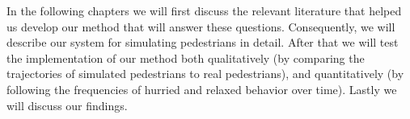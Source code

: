 \documentclass[11pt, a4paper]{book}
\begin{document}
In the following chapters we will first discuss the relevant literature that helped us develop our method that will answer these questions. Consequently, we will describe our system for simulating pedestrians in detail. After that we will test the implementation of our method both qualitatively (by comparing the trajectories of simulated pedestrians to real pedestrians), and quantitatively (by following the frequencies of hurried and relaxed behavior over time). Lastly we will discuss our findings.

\end{document}
